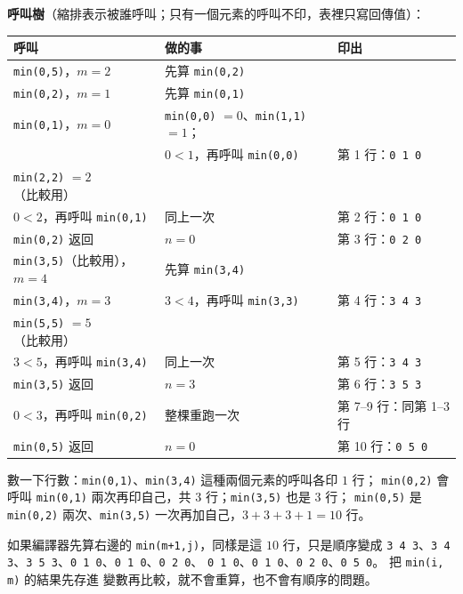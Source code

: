 \begin{pastsoln}
\textbf{呼叫樹}（縮排表示被誰呼叫；只有一個元素的呼叫不印，表裡只寫回傳值）：
\begin{center}
\small
\begin{tabular}{lll}
\toprule
呼叫 & 做的事 & 印出 \\
\midrule
\texttt{min(0,5)}，$m = 2$ & 先算 \texttt{min(0,2)} & \\
\quad \texttt{min(0,2)}，$m = 1$ & 先算 \texttt{min(0,1)} & \\
\qquad \texttt{min(0,1)}，$m = 0$ & \texttt{min(0,0)} $= 0$、\texttt{min(1,1)} $= 1$； & \\
 & $0 < 1$，再呼叫 \texttt{min(0,0)} & 第 1 行：\texttt{0 1 0} \\
\qquad \texttt{min(2,2)} $= 2$（比較用） & & \\
\qquad $0 < 2$，再呼叫 \texttt{min(0,1)} & 同上一次 & 第 2 行：\texttt{0 1 0} \\
\quad \texttt{min(0,2)} 返回 & $n = 0$ & 第 3 行：\texttt{0 2 0} \\
\quad \texttt{min(3,5)}（比較用），$m = 4$ & 先算 \texttt{min(3,4)} & \\
\qquad \texttt{min(3,4)}，$m = 3$ & $3 < 4$，再呼叫 \texttt{min(3,3)} & 第 4 行：\texttt{3 4 3} \\
\qquad \texttt{min(5,5)} $= 5$（比較用） & & \\
\qquad $3 < 5$，再呼叫 \texttt{min(3,4)} & 同上一次 & 第 5 行：\texttt{3 4 3} \\
\quad \texttt{min(3,5)} 返回 & $n = 3$ & 第 6 行：\texttt{3 5 3} \\
\quad $0 < 3$，再呼叫 \texttt{min(0,2)} & 整棵重跑一次 & 第 7--9 行：同第 1--3 行 \\
\texttt{min(0,5)} 返回 & $n = 0$ & 第 10 行：\texttt{0 5 0} \\
\bottomrule
\end{tabular}
\end{center}

數一下行數：\texttt{min(0,1)}、\texttt{min(3,4)} 這種兩個元素的呼叫各印 $1$ 行；
\texttt{min(0,2)} 會呼叫 \texttt{min(0,1)} 兩次再印自己，共 $3$ 行；\texttt{min(3,5)} 也是 $3$ 行；
\texttt{min(0,5)} 是 \texttt{min(0,2)} 兩次、\texttt{min(3,5)} 一次再加自己，$3 + 3 + 3 + 1 = 10$ 行。

如果編譯器先算右邊的 \texttt{min(m+1,j)}，同樣是這 $10$ 行，只是順序變成
\texttt{3 4 3}、\texttt{3 4 3}、\texttt{3 5 3}、\texttt{0 1 0}、\texttt{0 1 0}、\texttt{0 2 0}、
\texttt{0 1 0}、\texttt{0 1 0}、\texttt{0 2 0}、\texttt{0 5 0}。 把 \texttt{min(i, m)} 的結果先存進
變數再比較，就不會重算，也不會有順序的問題。
\end{pastsoln}

